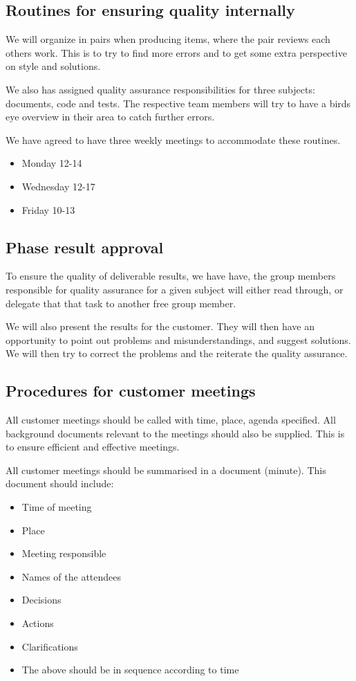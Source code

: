 \subsection{Routines for ensuring quality internally}
We will organize in pairs when producing items, where the pair reviews each others work. This is to try to find more errors and to get some extra perspective on style and solutions.

We also has assigned quality assurance responsibilities for three subjects: documents, code and tests. The respective team members will try to have a birds eye overview in their area to catch further errors.

We have agreed to have three weekly meetings to accommodate these routines.
\begin{itemize}
	\item Monday 12-14
	\item Wednesday 12-17
	\item Friday 10-13
\end{itemize}

\subsection{Phase result approval}
To ensure the quality of deliverable results, we have have, the group members responsible for quality assurance for a given subject will either read through, or delegate that that task to another free group member.

We will also present the results for the customer. They will then have an opportunity to point out problems and misunderstandings, and suggest solutions. We will then try to correct the problems and the reiterate the quality assurance.

\subsection{Procedures for customer meetings}
All customer meetings should be called with time, place, agenda specified. All background documents relevant to the meetings should also be supplied. This is to ensure efficient and effective meetings.

All customer meetings should be summarised in a document (minute). This document should include:
\begin{itemize}
	\item Time of meeting
	\item Place
	\item Meeting responsible
	\item Names of the attendees
	\item Decisions
	\item Actions
	\item Clarifications
	\item The above should be in sequence according to time
\end{itemize}

